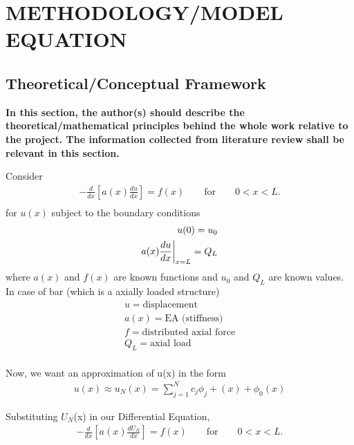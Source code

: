 
\chapter{METHODOLOGY/MODEL EQUATION}

\section{{\bf{Theoretical/Conceptual Framework}}}
{\bf\color{red}In this section, the author(s) should describe the theoretical/mathematical principles behind the whole work relative to the project. The information collected from literature review shall be relevant in this section.
}

Consider\\
\begin{eqnarray}
	-\frac{d}{dx} \left[a(x)\frac{du}{dx} \right] = f(x)  \quad\quad  \text{for} \quad\quad  0<x<L.\\
\end{eqnarray}
for $u(x)$ subject to the boundary conditions\\
\begin{eqnarray}
	u(0)= u_0 \\
	\vspace{1cm}
	a(x)\frac{du}{dx}\biggr|_{x=L} = Q_L	
\end{eqnarray}
where $a(x)$ and $f(x)$ are known functions and 
$u_0$ and $Q_L$ are known values.
In case of bar (which is a axially loaded structure)\\

\begin{eqnarray*}
	u = \text{displacement}\\
	a(x)= \text{EA (stiffness)}\\
	f = \text{distributed axial force}\\
	Q_L= \text{axial load}\\
\end{eqnarray*}

Now, we want an approximation of u(x) in the form
\begin{eqnarray}
	u(x)\approx u_N(x) = \sum\limits_{j=1}^N c_j\phi_{j} + (x) +\phi_{0}(x)
\end{eqnarray}


 Substituting  $U_N$(x) in our Differential Equation,\\
 
 \begin{eqnarray}
 	-\frac{d}{dx} \left[a(x)\frac{dU_N}{dx} \right] = f(x)  \quad\quad  \text{for} \quad\quad  0<x<L.
 \end{eqnarray}

